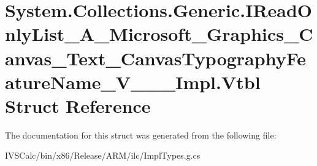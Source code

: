 \hypertarget{struct_system_1_1_collections_1_1_generic_1_1_i_read_only_list___a___microsoft___graphics___canv66a907a72586e3b527be3a18b914220b}{}\section{System.\+Collections.\+Generic.\+I\+Read\+Only\+List\+\_\+\+A\+\_\+\+Microsoft\+\_\+\+Graphics\+\_\+\+Canvas\+\_\+\+Text\+\_\+\+Canvas\+Typography\+Feature\+Name\+\_\+\+V\+\_\+\+\_\+\+\_\+\+Impl.\+Vtbl Struct Reference}
\label{struct_system_1_1_collections_1_1_generic_1_1_i_read_only_list___a___microsoft___graphics___canv66a907a72586e3b527be3a18b914220b}


The documentation for this struct was generated from the following file\+:\begin{DoxyCompactItemize}
\item 
I\+V\+S\+Calc/bin/x86/\+Release/\+A\+R\+M/ilc/Impl\+Types.\+g.\+cs\end{DoxyCompactItemize}
